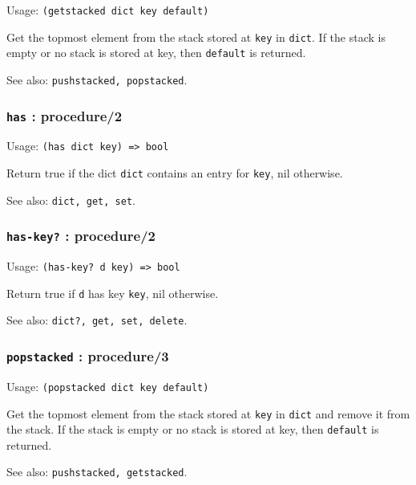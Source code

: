 \documentclass[
]{article}
\newcommand{\passthrough}[1]{#1}
\begin{document}
Usage: \passthrough{\lstinline!(getstacked dict key default)!}

Get the topmost element from the stack stored at
\passthrough{\lstinline!key!} in \passthrough{\lstinline!dict!}. If the
stack is empty or no stack is stored at key, then
\passthrough{\lstinline!default!} is returned.

See also: \passthrough{\lstinline!pushstacked, popstacked!}.

\hypertarget{has-procedure2}{%
\subsubsection{\texorpdfstring{\texttt{has} :
procedure/2}{has : procedure/2}}\label{has-procedure2}}

Usage: \passthrough{\lstinline!(has dict key) => bool!}

Return true if the dict \passthrough{\lstinline!dict!} contains an entry
for \passthrough{\lstinline!key!}, nil otherwise.

See also: \passthrough{\lstinline!dict, get, set!}.

\hypertarget{has-key-procedure2}{%
\subsubsection{\texorpdfstring{\texttt{has-key?} :
procedure/2}{has-key? : procedure/2}}\label{has-key-procedure2}}

Usage: \passthrough{\lstinline!(has-key? d key) => bool!}

Return true if \passthrough{\lstinline!d!} has key
\passthrough{\lstinline!key!}, nil otherwise.

See also: \passthrough{\lstinline!dict?, get, set, delete!}.

\hypertarget{popstacked-procedure3}{%
\subsubsection{\texorpdfstring{\texttt{popstacked} :
procedure/3}{popstacked : procedure/3}}\label{popstacked-procedure3}}

Usage: \passthrough{\lstinline!(popstacked dict key default)!}

Get the topmost element from the stack stored at
\passthrough{\lstinline!key!} in \passthrough{\lstinline!dict!} and
remove it from the stack. If the stack is empty or no stack is stored at
key, then \passthrough{\lstinline!default!} is returned.

See also: \passthrough{\lstinline!pushstacked, getstacked!}.
\end{document}
